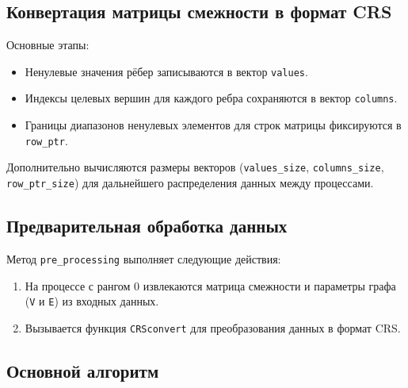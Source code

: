 \documentclass[a4paper,14pt]{extarticle}
\begin{document}
\subsection*{Конвертация матрицы смежности в формат CRS}

 Основные этапы:
\begin{itemize}
    \item Ненулевые значения рёбер записываются в вектор \texttt{values}.
    \item Индексы целевых вершин для каждого ребра сохраняются в вектор \texttt{columns}.
    \item Границы диапазонов ненулевых элементов для строк матрицы фиксируются в \texttt{row\_ptr}.
\end{itemize}
Дополнительно вычисляются размеры векторов (\texttt{values\_size}, \texttt{columns\_size}, \texttt{row\_ptr\_size}) для дальнейшего распределения данных между процессами.

\subsection*{Предварительная обработка данных}

Метод \texttt{pre\_processing} выполняет следующие действия:
\begin{enumerate}
    \item На процессе с рангом 0 извлекаются матрица смежности и параметры графа (\texttt{V} и \texttt{E}) из входных данных.
    \item Вызывается функция \texttt{CRSconvert} для преобразования данных в формат CRS.
\end{enumerate}

\subsection*{Основной алгоритм}
\end{document}
